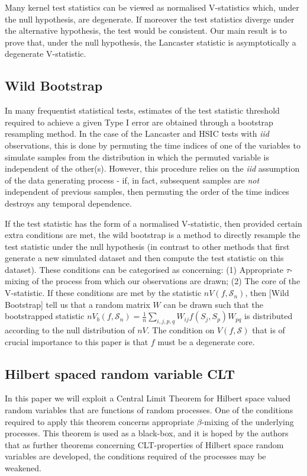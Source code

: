 \documentclass[]{article}
\begin{document}
Many kernel test statistics can be viewed as normalised V-statistics which, under the null hypothesis, are degenerate. If moreover the test statistics diverge under the alternative hypothesis, the test would be consistent. Our main result is to prove that, under the null hypothesis, the Lancaster statistic is asymptotically a degenerate V-statistic.

\subsection{Wild Bootstrap}

In many frequentist statistical tests, estimates of the test statistic threshold required to achieve a given Type I error are obtained through a bootstrap resampling method. In the case of the Lancaster and HSIC tests with \emph{iid} observations, this is done by permuting the time indices of one of the variables to simulate samples from the distribution in which the permuted variable is independent of the other(s). However, this procedure relies on the \emph{iid} assumption of the data generating process - if, in fact, subsequent samples are \emph{not} independent of previous samples, then permuting the order of the time indices destroys any temporal dependence. 

If the test statistic has the form of a normalised V-statistic, then provided certain extra conditions are met, the wild bootstrap is a method to directly resample the test statistic under the null hypothesis (in contrast to other methods that first generate a new simulated dataset and then compute the test statistic on this dataset). These conditions can be categorised as concerning: (1) Appropriate $\tau$-mixing of the process from which our observations are drawn; (2) The core of the V-statistic. If these conditions are met by the statistic $nV(f,\mathcal{S}_n)$, then [Wild Bootstrap] tell us that a random matrix $W$ can be drawn such that the bootstrapped statistic $nV_b(f,\mathcal{S}_n)=\frac{1}{n}\sum_{i,j,p,q}W_{ij}f(S_j,S_p)W_{pq}$ is distributed according to the null distribution of $nV$. The condition on $V(f,\mathcal{S})$ that is of crucial importance to this paper is that $f$ must be a degenerate core.




\subsection{Hilbert spaced random variable CLT}

In this paper we will exploit a Central Limit Theorem for Hilbert space valued random variables that are functions of random processes. One of the conditions required to apply this theorem concerns appropriate $\beta$-mixing of the underlying processes. This theorem is used as a black-box, and it is hoped by the authors that as further theorems concerning CLT-properties of Hilbert space random variables are developed, the conditions required of the processes may be weakened.
\end{document}
